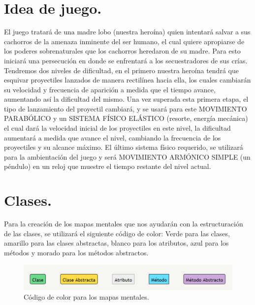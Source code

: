 \documentclass{article}
\begin{document}
\section{Idea de juego.}\label{integrado}
El juego tratará de una madre lobo (nuestra heroína) quien intentará salvar a sus cachorros de la amenaza inminente del ser humano, el cual quiere apropiarse de los poderes sobrenaturales que los cachorros heredaron de su madre. Para esto iniciará una persecución en donde se enfrentará a los secuestradores de sus crías. Tendremos dos niveles de dificultad, en el primero nuestra heroína tendrá que esquivar proyectiles lanzados de manera rectilínea hacia ella, los cuales cambiarán su velocidad y frecuencia de aparición a medida que el tiempo avance, aumentando así la dificultad del mismo. Una vez superada esta primera etapa, el tipo de lanzamiento del proyectil cambiará, y se usará para este MOVIMIENTO PARABÓLICO y un SISTEMA FÍSICO ELÁSTICO (resorte, energía mecánica) el cual dará la velocidad inicial de los proyectiles en este nivel, la dificultad aumentará a medida que avance el nivel, cambiando la frecuencia de los proyectiles y su alcance máximo.
El último sistema físico requerido, se utilizará para la ambientación del juego y será MOVIMIENTO ARMÓNICO SIMPLE (un péndulo) en un reloj que muestre el tiempo restante del nivel actual.


\section{Clases.}
Para la creación de los mapas mentales que nos ayudarán con la estructuración de las clases, se utilizará el siguiente código de color: Verde para las clases, amarillo para las clases abstractas, blanco para los atributos, azul para los métodos y morado para los métodos abstractos.

\begin{figure}[h]
\includegraphics[scale=0.8]{Images/colores.png}
\centering
\caption{Código de color para los mapas mentales.}
\label{fig:codigo}
\end{figure}
\end{document}
